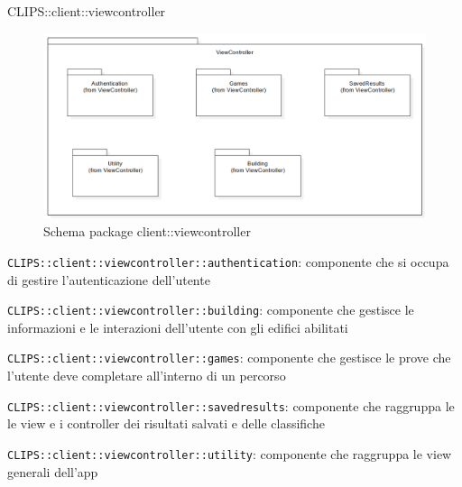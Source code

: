\begin{componente}{CLIPS::client::viewcontroller}
\begin{figure}[h!]
\centering
\includegraphics[scale=0.4]{img/package/png/client--viewcontroller.png}
\caption{Schema package client::viewcontroller}
 \end{figure}
\begin{compPackageContenuti}
\item \texttt{CLIPS::client::viewcontroller::authentication}: componente che si occupa di gestire l'autenticazione dell'utente
\item \texttt{CLIPS::client::viewcontroller::building}: componente che gestisce le informazioni e le interazioni dell'utente con gli edifici abilitati
\item \texttt{CLIPS::client::viewcontroller::games}: componente che gestisce le prove che l'utente deve completare all'interno di un percorso
\item \texttt{CLIPS::client::viewcontroller::savedresults}: componente che raggruppa le le view e i controller dei risultati salvati e delle classifiche
\item \texttt{CLIPS::client::viewcontroller::utility}: componente che raggruppa le view generali dell'app
\end{compPackageContenuti}
\end{componente}
